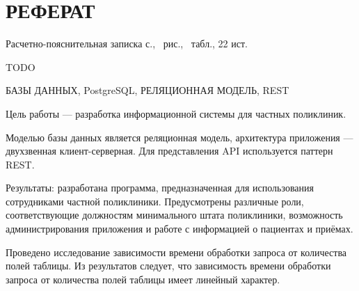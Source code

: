 \section*{\large РЕФЕРАТ}

Расчетно-пояснительная записка \pageref{LastPage} с., \totalfigures\ рис., \totaltables\ табл., 22 ист.

TODO

БАЗЫ ДАННЫХ, PostgreSQL, РЕЛЯЦИОННАЯ МОДЕЛЬ, REST


Цель работы --- разработка информационной системы для частных поликлиник.

Моделью базы данных является реляционная модель, архитектура приложения --- двухзвенная клиент-серверная.
Для представления API используется паттерн REST.

Результаты: разработана программа, предназначенная для использования сотрудниками частной поликлиники. Предусмотрены различные роли, соответствующие должностям минимального штата поликлиники, возможность администрирования приложения и работе с информацией о пациентах и приёмах.

Проведено исследование зависимости времени обработки запроса от количества полей таблицы.
Из результатов следует, что зависимость времени обработки запроса от количества полей таблицы имеет линейный характер.

\pagebreak